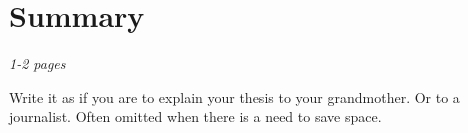 \chapter{Summary}
\label{ch:summary}
\textit{1-2 pages}

Write it as if you are to explain your thesis to your grandmother.
Or to a journalist.
Often omitted when there is a need to save space.